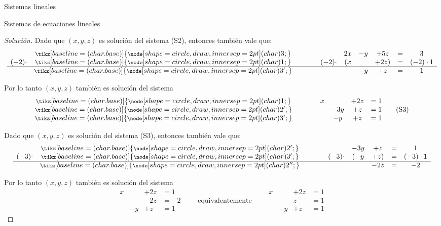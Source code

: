 \documentclass[a4paper,12pt,twoside,spanish,reqno]{amsbook}
\theoremstyle{definition}
\theoremstyle{remark}
\newcommand \circled[1]{\tikz[baseline=(char.base)]{
        \node[shape=circle,draw,inner sep=2pt] (char) {#1};}}
\begin{document}
\begin{chapter}{Sistemas lineales}
\begin{section}{Sistemas de ecuaciones lineales}
\begin{proof}[Solución]
 
Dado que $(x,y,z)$ es solución del sistema (S2),  entonces también vale que:
\begin{equation*}
\begin{matrix}
&{\footnotesize{\footnotesize\circled{3}}}&\qquad&&2x& -y & +5z & = &3 \\
(-2)\cdot&{\footnotesize{\footnotesize\circled{1}}}&\qquad&(-2)\cdot&(x &  & +2z) & = &(-2)\cdot1 \\
\hline
&{\footnotesize{\footnotesize\circled{3'}}}&\qquad&& & -y & + z & = & 1  
\end{matrix}
\end{equation*}
 

Por lo tanto $(x,y,z)$ también es solución del sistema
\begin{equation*}
\begin{matrix}
{\footnotesize{\footnotesize\circled{1}}}&\qquad&x &  & +2z & = 1 \\
{\footnotesize{\footnotesize\circled{2'}}}&\qquad&& -3y & +z & = 1   \\
{\footnotesize{\footnotesize\circled{3'}}}&\qquad&& -y & +z & =1
\end{matrix}\tag{S3}
\end{equation*}
 

 
Dado que $(x,y,z)$ es solución del sistema (S3), entonces también vale que: 
\begin{equation*}
\begin{matrix}
&{\footnotesize{\footnotesize\circled{2'}}}&\qquad&& -3y & +z & = & 1 \\
(-3)\cdot&{\footnotesize{\footnotesize\circled{3'}}}&\qquad&(-3)\cdot&( -y & +z) & = &(-3)\cdot1 \\
\hline
&{\footnotesize{\footnotesize\circled{2''}}}&\qquad&&   & -2z & = & -2  
\end{matrix}
\end{equation*}

 
Por lo tanto $(x,y,z)$ también es solución del sistema
\begin{equation*}
\begin{matrix}
x &  & +2z & = 1 \\
&    & -2z & = -2\\
& -y & +z & =1 
\end{matrix}
\qquad\mbox{equivalentemente}\qquad
\begin{matrix}
x &  & +2z & = 1 \\
&    & z & = 1\\
& -y & +z & =1 
\end{matrix}
\end{equation*}
 


\end{proof}
\end{section}
\end{chapter}
\end{document}
